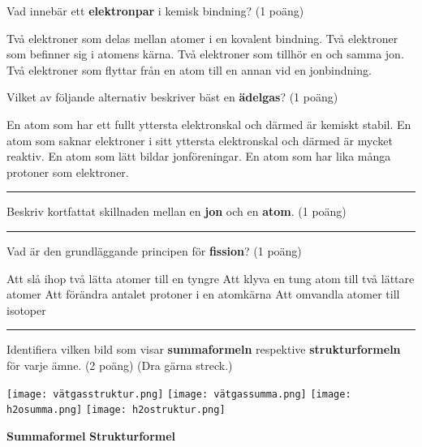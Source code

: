 \documentclass{exam}
\begin{document}
\begin{questions}
\question Vad innebär ett \textbf{elektronpar} i kemisk bindning? (1 poäng)
\begin{checkboxes}
\choice Två elektroner som delas mellan atomer i en kovalent bindning.
\choice Två elektroner som befinner sig i atomens kärna.
\choice Två elektroner som tillhör en och samma jon.
\choice Två elektroner som flyttar från en atom till en annan vid en jonbindning.
\end{checkboxes}

\break

\question Vilket av följande alternativ beskriver bäst en \textbf{ädelgas}? (1 poäng)
\vspace{2mm} 
\begin{checkboxes}
\choice En atom som har ett fullt yttersta elektronskal och därmed är kemiskt stabil.
\choice En atom som saknar elektroner i sitt yttersta elektronskal och därmed är mycket reaktiv.
\choice En atom som lätt bildar jonföreningar.
\choice En atom som har lika många protoner som elektroner.
\end{checkboxes}

\vspace{5mm} 
\hrule 
\vspace{5mm} 

\question Beskriv kortfattat skillnaden mellan en \textbf{jon} och en \textbf{atom}. (1 poäng)
\vspace{25mm} 
\hrule 
\vspace{5mm} 

\question Vad är den grundläggande principen för \textbf{fission}? (1 poäng)
\vspace{2mm} 
\begin{checkboxes}
    \choice Att slå ihop två lätta atomer till en tyngre
    \choice Att klyva en tung atom till två lättare atomer
    \choice Att förändra antalet protoner i en atomkärna
    \choice Att omvandla atomer till isotoper  
\end{checkboxes}

\vspace{5mm} 
\hrule 
\vspace{5mm} 

\question Identifiera vilken bild som visar \textbf{summaformeln} respektive \textbf{strukturformeln} för varje ämne. (2 poäng) (Dra gärna streck.)

\begin{center}
    \texttt{[image: vätgasstruktur.png]} \hspace{2cm} 
    \texttt{[image: vätgassumma.png]} \hspace{2cm} 
    \texttt{[image: h2osumma.png]} \hspace{2cm} 
    \texttt{[image: h2ostruktur.png]} 
\end{center}
\vspace{5mm} 
\begin{center}
    \textbf{Summaformel} \hspace{3cm} \textbf{Strukturformel}
\end{center}


\end{questions}
\end{document}

